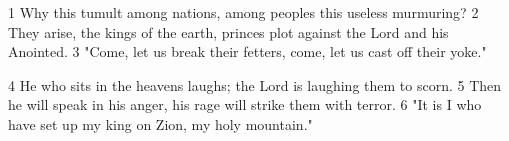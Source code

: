 1	Why this tumult among nations,
among peoples this useless murmuring?
2	They arise, the kings of the earth,
princes plot against the Lord and his Anointed.
3	"Come, let us break their fetters,
come, let us cast off their yoke."

4	He who sits in the heavens laughs;
the Lord is laughing them to scorn.
5	Then he will speak in his anger,
his rage will strike them with terror.
6	"It is I who have set up my king on Zion,
my holy mountain."

